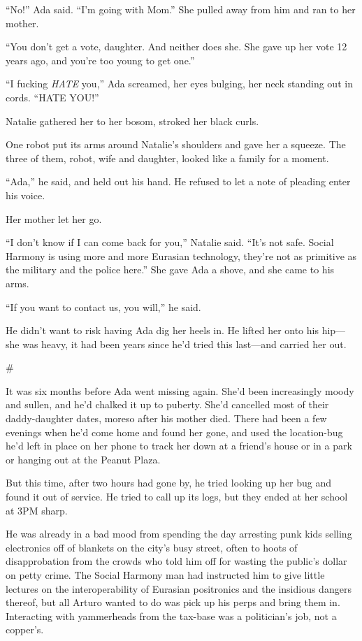“No!” Ada said. “I’m going with Mom.” She pulled away from him and
ran to her mother.

“You don’t get a vote, daughter. And neither does she. She gave up
her vote 12 years ago, and you’re too young to get one.”

“I fucking \emph{HATE} you,” Ada screamed, her eyes bulging, her
neck standing out in cords. “HATE YOU!”

Natalie gathered her to her bosom, stroked her black curls.

One robot put its arms around Natalie’s shoulders and gave her a
squeeze. The three of them, robot, wife and daughter, looked like a
family for a moment.

“Ada,” he said, and held out his hand. He refused to let a note of
pleading enter his voice.

Her mother let her go.

“I don’t know if I can come back for you,” Natalie said. “It’s not
safe. Social Harmony is using more and more Eurasian technology,
they’re not as primitive as the military and the police here.” She
gave Ada a shove, and she came to his arms.

“If you want to contact us, you will,” he said.

He didn’t want to risk having Ada dig her heels in. He lifted her
onto his hip—she was heavy, it had been years since he’d tried this
last—and carried her out.

\#

It was six months before Ada went missing again. She’d been
increasingly moody and sullen, and he’d chalked it up to puberty.
She’d cancelled most of their daddy-daughter dates, moreso after
his mother died. There had been a few evenings when he’d come home
and found her gone, and used the location-bug he’d left in place on
her phone to track her down at a friend’s house or in a park or
hanging out at the Peanut Plaza.

But this time, after two hours had gone by, he tried looking up her
bug and found it out of service. He tried to call up its logs, but
they ended at her school at 3PM sharp.

He was already in a bad mood from spending the day arresting punk
kids selling electronics off of blankets on the city’s busy street,
often to hoots of disapprobation from the crowds who told him off
for wasting the public’s dollar on petty crime. The Social Harmony
man had instructed him to give little lectures on the
interoperability of Eurasian positronics and the insidious dangers
thereof, but all Arturo wanted to do was pick up his perps and
bring them in. Interacting with yammerheads from the tax-base was a
politician’s job, not a copper’s.

